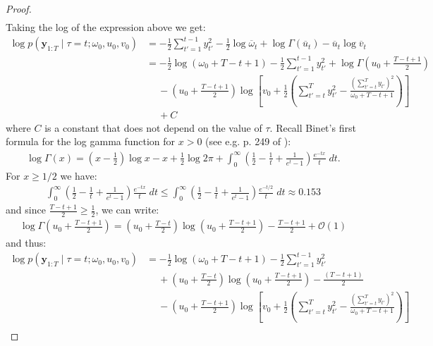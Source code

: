 \begin{proof}
\begin{align*}
\end{align*}
Taking the log of the expression above we get:
\begin{align*}
    \log p(\mathbf{y}_{1:T} \;|\; \tau = t; \omega_0,u_0,v_0) &= -\frac{1}{2}\sum_{t'=1}^{t-1} y_{t'}^2 - \frac{1}{2} \log \overline{\omega}_t + \log \Gamma(\overline{u}_t) - \overline{u}_t\log \overline{v}_t \\
    &= -\frac{1}{2}\log(\omega_0 + T - t + 1) - \frac{1}{2}\sum_{t'=1}^{t-1} y_{t'}^2 + \log \Gamma\left(u_0 + \frac{T - t +1}{2}\right)  \\
    &\quad\: - \left(u_0 + \frac{T - t +1}{2}\right)\log\left[v_0 +\frac{1}{2}\left(\sum_{t'=t}^T y_{t'}^2 - \frac{\left(\sum_{t'=t}^T y_{t'}\right)^2 }{\omega_0 + T- t +1}\right)\right] \\
    &\quad\: + C
\end{align*}
where $C$ is a constant that does not depend on the value of $\tau$. Recall Binet's first formula for the log gamma function for $x > 0$ (see e.g. p. 249 of \citealp{Whittaker96}): 
\begin{align*}
    \log \Gamma(x) = \left(x - \frac{1}{2}\right) \log x - x + \frac{1}{2} \log 2 \pi + \int_{0}^\infty\left(\frac{1}{2} - \frac{1}{t} + \frac{1}{e^t - 1} \right)\frac{e^{-tx}}{t} \;dt.
\end{align*}
For $x \geq 1/2$ we have:
\begin{align*}
    \int_{0}^\infty\left(\frac{1}{2} - \frac{1}{t} + \frac{1}{e^t - 1} \right)\frac{e^{-tx}}{t} \;dt \leq \int_{0}^\infty\left(\frac{1}{2} - \frac{1}{t} + \frac{1}{e^t - 1} \right)\frac{e^{-t/2}}{t} \;dt \approx 0.153
\end{align*}
and since $\frac{T-t+1}{2} \geq \frac{1}{2}$, we can write:
\begin{align*}
    \log \Gamma\left(u_0 + \frac{T - t +1}{2}\right) = \left(u_0 + \frac{T - t}{2}\right) \log\left(u_0 + \frac{T - t +1}{2}\right) - \frac{T - t +1}{2} +\mathcal{O}(1)
\end{align*}
and thus:
\small
\begin{align*}
    \log p(\mathbf{y}_{1:T} \;|\; \tau = t; \omega_0,u_0,v_0) &= -\frac{1}{2}\log(\omega_0 + T - t + 1) - \frac{1}{2}\sum_{t'=1}^{t-1} y_{t'}^2  \\
    &\quad\: +\left(u_0 + \frac{T-t}{2}\right) \log \left(u_0 + \frac{T-t+1}{2}\right) - \frac{(T-t+1)}{2}  \\
    &\quad\: - \left(u_0 + \frac{T - t +1}{2}\right)\log\left[v_0 +\frac{1}{2}\left(\sum_{t'=t}^T y_{t'}^2 - \frac{\left(\sum_{t'=t}^T y_{t'}\right)^2}{\omega_0 + T- t +1}\right) \right] \\

\end{align*}
\end{proof}

